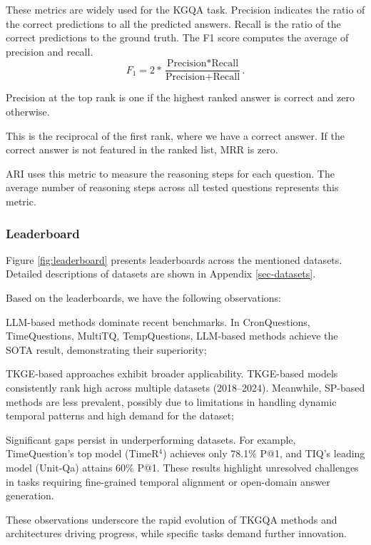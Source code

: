  These metrics are widely used for the KGQA task. Precision indicates the ratio of the correct predictions to all the predicted answers. 
Recall is the ratio of the correct predictions to the ground truth.
The F1 score computes the average of precision and recall.
\[
F_1 = 2 \ast \frac{\text{Precision} \ast \text{Recall}}{\text{Precision} + \text{Recall}}.
\]

 Precision at the top rank is one if the highest ranked answer is correct and zero otherwise.

 This is the reciprocal of the first rank, where we have a correct answer. If the correct answer is not featured in the ranked list, MRR is zero.

ARI uses this metric to measure the reasoning steps for each question. The average number of reasoning steps across all tested questions represents this metric.
\subsubsection{Leaderboard}
\label{leaderboard}
Figure \ref{fig:leaderboard} presents leaderboards across the mentioned datasets. Detailed descriptions of datasets are shown in Appendix \ref{sec-datasets}. 

Based on the leaderboards, we have the following observations:
\begin{inparaenum}[(i)]
\item LLM-based methods dominate recent benchmarks. In CronQuestions, TimeQuestions, MultiTQ, TempQuestions, LLM-based methods achieve the SOTA result, demonstrating their superiority;
\item  TKGE-based approaches exhibit broader applicability. TKGE-based models consistently rank high across multiple datasets (2018–2024). Meanwhile, SP-based methods are less prevalent, possibly due to limitations in handling dynamic temporal patterns and high demand for the dataset;
\item Significant gaps persist in underperforming datasets. For example, TimeQuestion's top model (TimeR$^4$) achieves only 78.1\% P@1, and TIQ's leading model (Unit-Qa) attains 60\% P@1. These results highlight unresolved challenges in tasks requiring fine-grained temporal alignment or open-domain answer generation.
\end{inparaenum}
These observations underscore the rapid evolution of TKGQA methods and architectures driving progress, while specific tasks demand further innovation.



